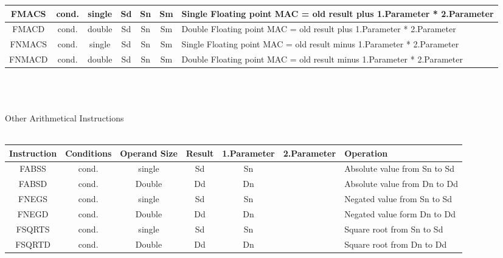 \begin{landscape}
\begin{tabular}{|c|c|c|c|c|c|l|}
\hline
FMACS & cond. & single & Sd & Sn & Sm & Single Floating point MAC = old result plus 1.Parameter * 2.Parameter\\
\hline
FMACD & cond. & double & Sd & Sn & Sm & Double Floating point MAC = old result plus 1.Parameter * 2.Parameter\\
\hline
FNMACS & cond. & single & Sd & Sn & Sm & Single Floating point MAC = old result minus 1.Parameter * 2.Parameter\\
\hline
FNMACD & cond. & double & Sd & Sn & Sm & Double Floating point MAC = old result minus 1.Parameter * 2.Parameter\\
\hline
\end{tabular}\\
\\
\\
{\rot Other Arithmetical Instructions}\\
\\
\begin{tabular}{|c|c|c|c|c|c|l|}
\hline
Instruction & Conditions & Operand Size & Result & 1.Parameter & 2.Parameter & Operation\\
\hline
FABSS & cond. & single & Sd & Sn &  & Absolute value from Sn to Sd\\
\hline
FABSD & cond. & Double & Dd & Dn &  & Absolute value from Dn to Dd\\
\hline
FNEGS & cond. & single & Sd & Sn &  & Negated value from Sn to Sd\\
\hline
FNEGD & cond. & Double & Dd & Dn &  & Negated value form Dn to Dd\\
\hline
FSQRTS & cond. & single & Sd & Sn &  & Square root from Sn to Sd\\
\hline
FSQRTD & cond. & Double & Dd & Dn &  & Square root from Dn to Dd\\
\hline
\end{tabular}\\
\\

\newpage

\end{landscape}
